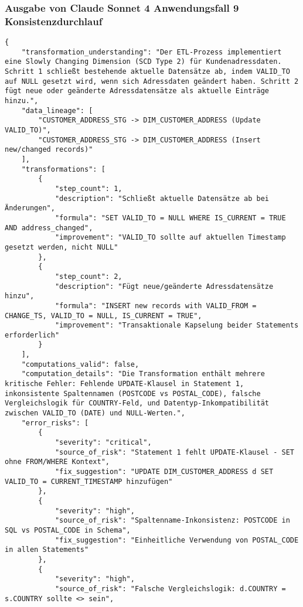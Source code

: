 \subsubsection{Ausgabe von Claude Sonnet 4 Anwendungsfall 9 Konsistenzdurchlauf}\label{anhang:subsubsec:claude_case9_prompt2}
\begin{lstlisting}[caption={Ausgabe: Claude Sonnet 4 Anwendungsfall 9 Konsistenzdurchlauf},label={claude_case9_prompt2}]
{
    "transformation_understanding": "Der ETL-Prozess implementiert eine Slowly Changing Dimension (SCD Type 2) für Kundenadressdaten. Schritt 1 schließt bestehende aktuelle Datensätze ab, indem VALID_TO auf NULL gesetzt wird, wenn sich Adressdaten geändert haben. Schritt 2 fügt neue oder geänderte Adressdatensätze als aktuelle Einträge hinzu.",
    "data_lineage": [
        "CUSTOMER_ADDRESS_STG -> DIM_CUSTOMER_ADDRESS (Update VALID_TO)",
        "CUSTOMER_ADDRESS_STG -> DIM_CUSTOMER_ADDRESS (Insert new/changed records)"
    ],
    "transformations": [
        {
            "step_count": 1,
            "description": "Schließt aktuelle Datensätze ab bei Änderungen",
            "formula": "SET VALID_TO = NULL WHERE IS_CURRENT = TRUE AND address_changed",
            "improvement": "VALID_TO sollte auf aktuellen Timestamp gesetzt werden, nicht NULL"
        },
        {
            "step_count": 2,
            "description": "Fügt neue/geänderte Adressdatensätze hinzu",
            "formula": "INSERT new records with VALID_FROM = CHANGE_TS, VALID_TO = NULL, IS_CURRENT = TRUE",
            "improvement": "Transaktionale Kapselung beider Statements erforderlich"
        }
    ],
    "computations_valid": false,
    "computation_details": "Die Transformation enthält mehrere kritische Fehler: Fehlende UPDATE-Klausel in Statement 1, inkonsistente Spaltennamen (POSTCODE vs POSTAL_CODE), falsche Vergleichslogik für COUNTRY-Feld, und Datentyp-Inkompatibilität zwischen VALID_TO (DATE) und NULL-Werten.",
    "error_risks": [
        {
            "severity": "critical",
            "source_of_risk": "Statement 1 fehlt UPDATE-Klausel - SET ohne FROM/WHERE Kontext",
            "fix_suggestion": "UPDATE DIM_CUSTOMER_ADDRESS d SET VALID_TO = CURRENT_TIMESTAMP hinzufügen"
        },
        {
            "severity": "high",
            "source_of_risk": "Spaltenname-Inkonsistenz: POSTCODE in SQL vs POSTAL_CODE in Schema",
            "fix_suggestion": "Einheitliche Verwendung von POSTAL_CODE in allen Statements"
        },
        {
            "severity": "high",
            "source_of_risk": "Falsche Vergleichslogik: d.COUNTRY = s.COUNTRY sollte <> sein",

\end{lstlisting}
